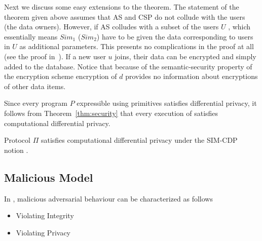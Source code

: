Next we discuss some easy extensions to the theorem.  The statement of
the theorem given above assumes that \textsf{AS} and \textsf{CSP} do
not collude with the users (the data owners). However, if \textsf{AS}
colludes with a subset of the users $U$ , which essentially means $Sim_1$
($Sim_2$) have to be given the data corresponding to users in $U$ as
additional parameters. This presents no complications in the proof at
all (see the proof in~\cite{LReg}). If a new user $u$ joins, their
data can be encrypted and simply added to the database. Notice that
because of the semantic-security property of the encryption scheme
encryption of $d$ provides no information about encryptions of other
data items. 

Since every program $P$
expressible using \system primitives satisfies differential privacy,
it follows from Theorem~\ref{thm:security} that every execution of
\system satisfies computational differential privacy.
 \noindent
\begin{corollary} 
	Protocol $\Pi$ satisfies computational differential privacy under the \textsf{SIM-CDP} notion \cite{CDP}.
\end{corollary}

\subsection{Malicious Model}
In \system, malicious adversarial behaviour can be characterized as follows \begin{itemize}\item Violating Integrity  \item Violating Privacy \end{itemize}

